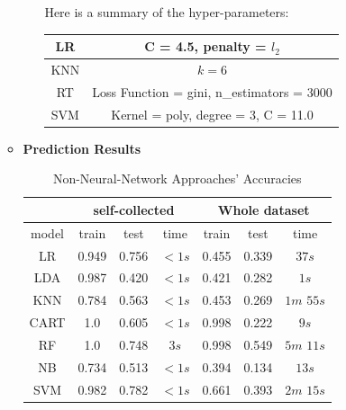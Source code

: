 \documentclass[11.5pt]{article}
\begin{document}
\begin{enumerate}
\begin{itemize}
\begin{enumerate}
\begin{figure}
                \end{figure}
                Here is a summary of the hyper-parameters:
            \begin{center}
                \begin{tabular}{|c|c|}
                    \hline
                    LR&C = 4.5, penalty = $l_2$\\ \hline
                    KNN& $k = 6$\\ \hline
                    RT& Loss Function = gini, n\_estimators = 3000\\ \hline
                    SVM& Kernel = poly, degree = 3, C = 11.0\\ \hline
                \end{tabular}
            \end{center}
            \end{enumerate}
            \item \textbf{Prediction Results}
            \begin{table}[h!]
                \centering
                \caption{Non-Neural-Network Approaches' Accuracies}
                    \begin{tabular}{|c|c|c|c|c|c|c|}
                        \hline
                         & \multicolumn{3}{|c|}{self-collected} & \multicolumn{3}{|c|}{Whole dataset} \\ \hline
                        model & train & test & time & train & test & time \\ \hline
                        LR & 0.949 & 0.756 & $<1s$ & 0.455 & 0.339 & $37s$ \\ \hline
                        LDA  & 0.987 & 0.420 & $<1s$ & 0.421 & 0.282 & $1s$ \\ \hline
                        KNN & 0.784 & 0.563 & $<1s$ & 0.453 & 0.269 & $1m$ $55s$ \\ \hline
                        CART & 1.0 & 0.605 & $<1s$ & 0.998 & 0.222 & $9s$ \\ \hline
                        RF & 1.0 & 0.748 & $3s$ & 0.998 & 0.549 & $5m$ $11s$\\ \hline
                        NB & 0.734 & 0.513 & $<1s$ & 0.394 & 0.134 & $13s$ \\ \hline
                        SVM  & 0.982 & 0.782 & $<1s$ & 0.661 & 0.393 & $2m$ $15s$ \\ \hline
                    \end{tabular}
            \end{table}


\end{itemize}
\end{enumerate}
\end{document}
